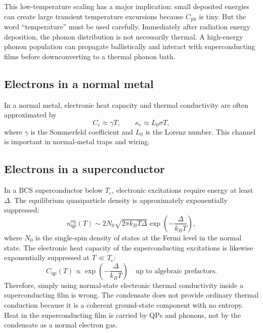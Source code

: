 \documentclass[11pt]{article}
\newcommand{\Tc}{T_{\mathrm{c}}}
\newcommand{\Cph}{C_{\mathrm{ph}}}
\newcommand{\Cqp}{C_{\mathrm{qp}}}
\newcommand{\nqp}{n_{\mathrm{qp}}}
\begin{document}
This low-temperature scaling has a major implication: small deposited energies can create large transient temperature excursions because \(\Cph\) is tiny. But the word ``temperature'' must be used carefully. Immediately after radiation energy deposition, the phonon distribution is not necessarily thermal. A high-energy phonon population can propagate ballistically and interact with superconducting films before downconverting to a thermal phonon bath.

\subsection{Electrons in a normal metal}

In a normal metal, electronic heat capacity and thermal conductivity are often approximated by
\begin{equation}
C_e \approx \gamma T,
\qquad
\kappa_e \approx L_0 \sigma T,
\label{eq:normal_metal_electrons}
\end{equation}
where \(\gamma\) is the Sommerfeld coefficient and \(L_0\) is the Lorenz number. This channel is important in normal-metal traps and wiring.

\subsection{Electrons in a superconductor}

In a BCS superconductor below \(\Tc\), electronic excitations require energy at least \(\Delta\). The equilibrium quasiparticle density is approximately exponentially suppressed:
\begin{equation}
\nqp^{\mathrm{eq}}(T) \sim 2N_0\sqrt{2\pi k_B T\Delta}\exp\left(-\frac{\Delta}{k_B T}\right),
\label{eq:nqp_eq}
\end{equation}
where \(N_0\) is the single-spin density of states at the Fermi level in the normal state. The electronic heat capacity of the superconducting excitations is likewise exponentially suppressed at \(T\ll\Tc\):
\begin{equation}
\Cqp(T) \propto \exp\left(-\frac{\Delta}{k_B T}\right)
\quad \text{up to algebraic prefactors.}
\label{eq:Cqp_exp}
\end{equation}
Therefore, simply using normal-state electronic thermal conductivity inside a superconducting film is wrong. The condensate does not provide ordinary thermal conduction because it is a coherent ground-state component with no entropy. Heat in the superconducting film is carried by QPs and phonons, not by the condensate as a normal electron gas.
\end{document}

